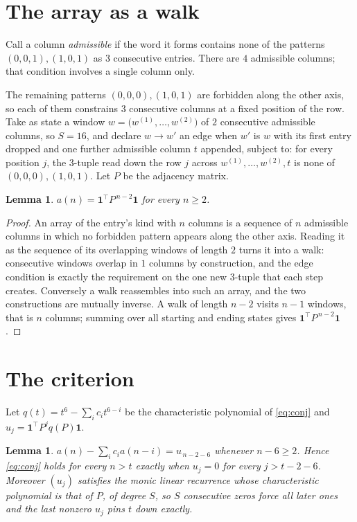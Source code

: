 \documentclass[11pt,a4paper]{article}
\theoremstyle{plain}
\newtheorem{lemma}[theorem]{Lemma}
\theoremstyle{definition}
\begin{document}
\section{The array as a walk}

Call a column \emph{admissible} if the word it forms contains none of the patterns
$(0,0,1), (1,0,1)$ as $3$ consecutive entries. There are $4$ admissible columns; that condition
involves a single column only.

The remaining patterns $(0,0,0), (1,0,1)$ are forbidden along the other axis, so each of them
constrains $3$ consecutive columns at a fixed position of the row. Take as state a
window $w=\bigl(w^{(1)},\dots,w^{(2)}\bigr)$ of $2$ consecutive admissible
columns, so $S=16$, and declare $w\to w'$ an edge when $w'$ is $w$ with its first entry
dropped and one further admissible column $t$ appended, subject to: for every position
$j$, the $3$-tuple read down the row $j$ across $w^{(1)},\dots,w^{(2)},t$
is none of $(0,0,0), (1,0,1)$. Let $P$ be the adjacency matrix.

\begin{lemma}\label{lem:walk}
$a(n)=\mathbf{1}^{\!\top}P^{\,n-2}\mathbf{1}$ for every $n\ge2$.
\end{lemma}

\begin{proof}
An array of the entry's kind with $n$ columns is a sequence of $n$ admissible columns in
which no forbidden pattern appears along the other axis. Reading it as the sequence of its
overlapping windows of length $2$ turns it into a walk: consecutive windows overlap in
$1$ columns by construction, and the edge condition is exactly the requirement on the one
new $3$-tuple that each step creates. Conversely a walk reassembles into such an array,
and the two constructions are mutually inverse. A walk of length $n-2$ visits $n-1$
windows, that is $n$ columns; summing over all starting and ending states gives
$\mathbf{1}^{\!\top}P^{\,n-2}\mathbf{1}$.
\end{proof}

\section{The criterion}

Let $q(t)=t^{6}-\sum_i c_i t^{6-i}$ be the characteristic polynomial of
\eqref{eq:conj} and $u_j=\mathbf{1}^{\!\top}P^{j}q(P)\mathbf{1}$.

\begin{lemma}\label{lem:crit}
$a(n)-\sum_i c_i a(n-i)=u_{\,n-2-6}$ whenever $n-6\ge2$. Hence
\eqref{eq:conj} holds for every $n>t$ exactly when $u_j=0$ for every
$j>t-2-6$. Moreover $(u_j)$ satisfies the monic linear recurrence whose
characteristic polynomial is that of $P$, of degree $S$, so $S$ consecutive zeros force all
later ones and the last nonzero $u_j$ pins $t$ down exactly.
\end{lemma}
\end{document}
